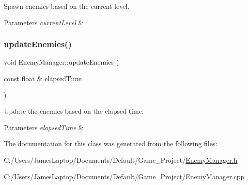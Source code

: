 Spawn enemies based on the current level. 


\begin{DoxyParams}{Parameters}
{\em current\+Level} & \\
\hline
\end{DoxyParams}
\mbox{\label{class_enemy_manager_a8a3caf890d121478e41dcc192a8aa4a2}} 
\subsubsection{\texorpdfstring{update\+Enemies()}{updateEnemies()}}
{\footnotesize\ttfamily void Enemy\+Manager\+::update\+Enemies (\begin{DoxyParamCaption}\item[{const float \&}]{elapsed\+Time }\end{DoxyParamCaption})}



Update the enemies based on the elapsed time. 


\begin{DoxyParams}{Parameters}
{\em elapsed\+Time} & \\
\hline
\end{DoxyParams}


The documentation for this class was generated from the following files\+:\begin{DoxyCompactItemize}
\item 
C\+:/\+Users/\+James\+Laptop/\+Documents/\+Default/\+Game\+\_\+\+Project/\hyperlink{_enemy_manager_8h}{Enemy\+Manager.\+h}\item 
C\+:/\+Users/\+James\+Laptop/\+Documents/\+Default/\+Game\+\_\+\+Project/Enemy\+Manager.\+cpp\end{DoxyCompactItemize}

